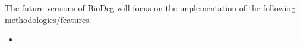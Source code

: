 The future versions of BioDeg will focus on the implementation of the following methodologies/features.
\begin{itemize}
\item 
\end{itemize} 
